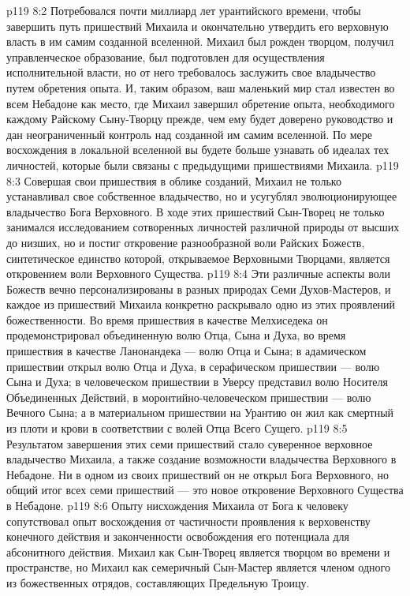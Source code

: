 \vs p119 8:2 \pc Потребовался почти миллиард лет урантийского времени, чтобы завершить путь пришествий Михаила и окончательно утвердить его верховную власть в им самим созданной вселенной. Михаил был рожден творцом, получил управленческое образование, был подготовлен для осуществления исполнительной власти, но от него требовалось заслужить свое владычество путем обретения опыта. И, таким образом, ваш маленький мир стал известен во всем Небадоне как место, где Михаил завершил обретение опыта, необходимого каждому Райскому Сыну\hyp{}Творцу прежде, чем ему будет доверено руководство и дан неограниченный контроль над созданной им самим вселенной. По мере восхождения в локальной вселенной вы будете больше узнавать об идеалах тех личностей, которые были связаны с предыдущими пришествиями Михаила.
\vs p119 8:3 \pc Совершая свои пришествия в облике созданий, Михаил не только устанавливал свое собственное владычество, но и усугублял эволюционирующее владычество Бога Верховного. В ходе этих пришествий Сын\hyp{}Творец не только занимался исследованием сотворенных личностей различной природы от высших до низших, но и постиг откровение разнообразной воли Райских Божеств, синтетическое единство которой, открываемое Верховными Творцами, является откровением воли Верховного Существа.
\vs p119 8:4 Эти различные аспекты воли Божеств вечно персонализированы в разных природах Семи Духов\hyp{}Мастеров, и каждое из пришествий Михаила конкретно раскрывало одно из этих проявлений божественности. Во время пришествия в качестве Мелхиседека он продемонстрировал объединенную волю Отца, Сына и Духа, во время пришествия в качестве Ланонандека --- волю Отца и Сына; в адамическом пришествии открыл волю Отца и Духа, в серафическом пришествии --- волю Сына и Духа; в человеческом пришествии в Уверсу представил волю Носителя Объединенных Действий, в моронтийно\hyp{}человеческом пришествии --- волю Вечного Сына; а в материальном пришествии на Урантию он жил как смертный из плоти и крови в соответствии с волей Отца Всего Сущего.
\vs p119 8:5 Результатом завершения этих семи пришествий стало суверенное верховное владычество Михаила, а также создание возможности владычества Верховного в Небадоне. Ни в одном из своих пришествий он не открыл Бога Верховного, но общий итог всех семи пришествий --- это новое откровение Верховного Существа в Небадоне.
\vs p119 8:6 Опыту нисхождения Михаила от Бога к человеку сопутствовал опыт восхождения от частичности проявления к верховенству конечного действия и законченности освобождения его потенциала для абсонитного действия. Михаил как Сын\hyp{}Творец является творцом во времени и пространстве, но Михаил как семеричный Сын\hyp{}Мастер является членом одного из божественных отрядов, составляющих Предельную Троицу.
